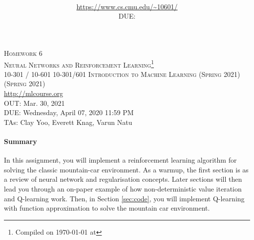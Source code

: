 \documentclass[11pt,addpoints,answers]{exam}
\title{\textsc{\hwName}
} %
\author{\courseName\\
\url{https://www.cs.cmu.edu/~10601/} \\
DUE: \dueDate{} \\ 
}
\date{}
\date{}
\title{\textsc{\hwName}} %
\author{}
\date{}
\newcommand{\courseName}{10-301/601 Introduction to Machine Learning (Spring 2021)}
\newcommand{\dueDate}{Wednesday, April 07, 2020 11:59 PM}
\newcommand{\courseNum}{10-301 / 10-601}
\newcommand{\courseName}{Introduction to Machine Learning}
\newcommand{\courseSem}{Spring 2021}
\newcommand{\courseUrl}{\url{http://mlcourse.org}}
\newcommand{\hwNum}{Homework 6}
\newcommand{\hwTopic}{Neural Networks and Reinforcement Learning}
\newcommand{\outDate}{Mar. 30, 2021}
\newcommand{\dueDate}{Apr. 7, 2021 11:59 PM}
\newcommand{\taNames}{Clay Yoo, Everett Knag, Varun Natu}
\begin{document}
\section*{}
\begin{center}
  \textsc{\LARGE \hwNum} \\
  \textsc{\LARGE \hwTopic\footnote{Compiled on \today{} at \currenttime{}}} \\
  \vspace{1em}
  \textsc{\large \courseNum{} \courseName{} (\courseSem)} \\
  \courseUrl\\
  \vspace{1em}
  OUT: \outDate \\
  DUE: \dueDate \\
  TAs: \taNames
\end{center}


\begin{notebox}
\paragraph{Summary} In this assignment, you will implement a reinforcement learning algorithm for solving the classic mountain-car environment. As a warmup, the first section is as a review of neural network and regularisation concepts. Later sections will then lead you through an on-paper example of how non-deterministic value iteration and Q-learning work. Then, in Section \ref{sec:code}, you will implement Q-learning with function approximation to solve the mountain car environment.

\end{notebox}
\end{document}
